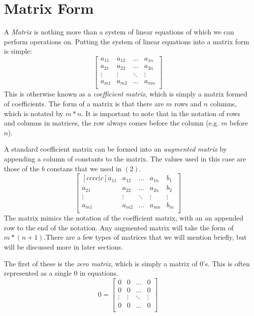 \section{Matrix Form}
A \emph{Matrix} is nothing more than a system of linear equations of which we
can perform operations on.  Putting the system of linear equations into a matrix
form is simple:
\begin{equation}
    \begin{bmatrix}
        a_{11} & a_{12} & \ldots & a_{1n} \\
        a_{21} & a_{22} & \ldots & a_{2n} \\
        \vdots & \vdots & \ddots & \vdots \\
        a_{m1} & a_{m2} & \ldots & a_{mn} \\
    \end{bmatrix}
\end{equation}
This is otherwise known as a \emph{coefficient matrix}, which is simply a matrix
formed of coefficients. The form of a matrix is that there are $m$ rows and $n$
columns, which is notated by $m * n$. It is important to note that in the
notation of rows and columns in matrices, the row always comes before the column
(e.g. $m$ before $n$).

A standard coefficient matrix can be formed into an \emph{augmented matrix} by
appending a column of constants to the matrix. The values used in this case are
those of the $b$ constans that we used in $(2)$.
\begin{equation}
    \begin{bmatrix}[cccc|c]
        a_{11} & a_{12} & \ldots & a_{1n} & b_1 \\
        a_{21} & a_{22} & \ldots & a_{2n} & b_2 \\
        \vdots & \vdots & \ddots & \vdots & \vdots \\
        a_{m1} & a_{m2} & \ldots & a_{mn} & b_m \\
    \end{bmatrix}
\end{equation}
The matrix mimics the notation of the coefficient matrix, with an an appended
row to the end of the notation. Any augmented matrix will take the form of
$m*(n+1)$.There are a few types of matrices that we will mention briefly, but will be
discussed more in later sections. 

The first of these is the \emph{zero matrix},
which is simply a matrix of 0's. This is often represented as a single 0 in
equations.
\begin{equation}
    0 = 
    \begin{bmatrix}
        0 & 0 & \ldots & 0 \\
        0 & 0 & \ldots & 0  \\
        \vdots & \vdots & \ddots & \vdots \\
        0 & 0 & \ldots & 0 \\
    \end{bmatrix}
\end{equation}

